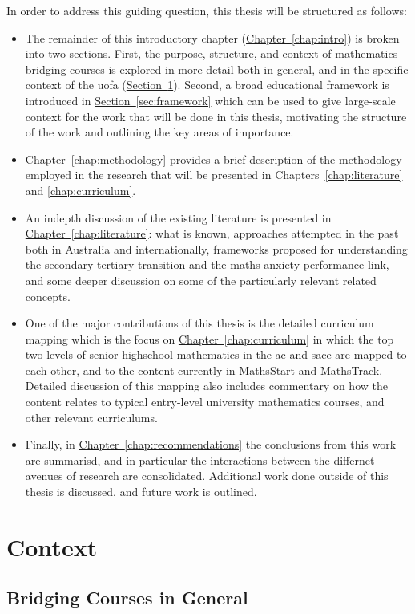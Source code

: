 \documentclass[twoside,12pt,a4paper]{report}
\newcommand{\refchap}[1]{\hyperref[chap:#1]{Chapter~\ref{chap:#1}}}
\newcommand{\refsec}[1]{\hyperref[sec:#1]{Section~\ref{sec:#1}}}
\begin{document}
In order to address this guiding question, this thesis will be structured as follows:
\begin{itemize}
	\item The remainder of this introductory chapter (\refchap{intro}) is broken into two sections. First, the purpose, structure, and context of mathematics bridging courses is explored in more detail both in general, and in the specific context of the \gls{uofa} (\refsec{context}). Second, a broad educational framework is introduced in \refsec{framework} which can be used to give large-scale context for the work that will be done in this thesis, motivating the structure of the work and outlining the key areas of importance.
	\item \refchap{methodology} provides a brief description of the methodology employed in the research that will be presented in Chapters~\ref{chap:literature} and \ref{chap:curriculum}.
	\item An indepth discussion of the existing literature is presented in \refchap{literature}: what is known, approaches attempted in the past both in Australia and internationally, frameworks proposed for understanding the secondary-tertiary transition and the maths anxiety-performance link, and some deeper discussion on some of the particularly relevant related concepts.
	\item One of the major contributions of this thesis is the detailed curriculum mapping which is the focus on \refchap{curriculum} in which the top two levels of senior highschool mathematics in the \gls{ac} and \gls{sace} are mapped to each other, and to the content currently in MathsStart and MathsTrack. Detailed discussion of this mapping also includes commentary on how the content relates to typical entry-level university mathematics courses, and other relevant curriculums. 
	\item Finally, in \refchap{recommendations} the conclusions from this work are summarisd, and in particular the interactions between the differnet avenues of research are consolidated. Additional work done outside of this thesis is discussed, and future work is outlined.
\end{itemize}



\section{Context}
\label{sec:context}

\subsection{Bridging Courses in General}
\end{document}
